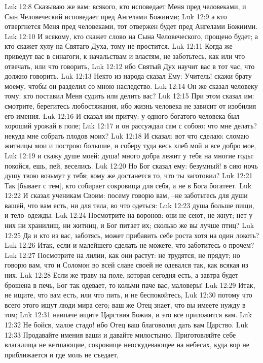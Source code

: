Luk 12:8  Сказываю же вам: всякого, кто исповедает Меня пред человеками, и Сын Человеческий исповедает пред Ангелами Божиими;
Luk 12:9  а кто отвергнется Меня пред человеками, тот отвержен будет пред Ангелами Божиими.
Luk 12:10  И всякому, кто скажет слово на Сына Человеческого, прощено будет; а кто скажет хулу на Святаго Духа, тому не простится.
Luk 12:11  Когда же приведут вас в синагоги, к начальствам и властям, не заботьтесь, как или что отвечать, или что говорить,
Luk 12:12  ибо Святый Дух научит вас в тот час, что должно говорить.
Luk 12:13  Некто из народа сказал Ему: Учитель! скажи брату моему, чтобы он разделил со мною наследство.
Luk 12:14  Он же сказал человеку тому: кто поставил Меня судить или делить вас?
Luk 12:15  При этом сказал им: смотрите, берегитесь любостяжания, ибо жизнь человека не зависит от изобилия его имения.
Luk 12:16  И сказал им притчу: у одного богатого человека был хороший урожай в поле;
Luk 12:17  и он рассуждал сам с собою: что мне делать? некуда мне собрать плодов моих?
Luk 12:18  И сказал: вот что сделаю: сломаю житницы мои и построю большие, и соберу туда весь хлеб мой и все добро мое,
Luk 12:19  и скажу душе моей: душа! много добра лежит у тебя на многие годы: покойся, ешь, пей, веселись.
Luk 12:20  Но Бог сказал ему: безумный! в сию ночь душу твою возьмут у тебя; кому же достанется то, что ты заготовил?
Luk 12:21  Так [бывает с тем], кто собирает сокровища для себя, а не в Бога богатеет.
Luk 12:22  И сказал ученикам Своим: посему говорю вам, --не заботьтесь для души вашей, что вам есть, ни для тела, во что одеться:
Luk 12:23  душа больше пищи, и тело--одежды.
Luk 12:24  Посмотрите на воронов: они не сеют, не жнут; нет у них ни хранилищ, ни житниц, и Бог питает их; сколько же вы лучше птиц?
Luk 12:25  Да и кто из вас, заботясь, может прибавить себе роста хотя на один локоть?
Luk 12:26  Итак, если и малейшего сделать не можете, что заботитесь о прочем?
Luk 12:27  Посмотрите на лилии, как они растут: не трудятся, не прядут; но говорю вам, что и Соломон во всей славе своей не одевался так, как всякая из них.
Luk 12:28  Если же траву на поле, которая сегодня есть, а завтра будет брошена в печь, Бог так одевает, то кольми паче вас, маловеры!
Luk 12:29  Итак, не ищите, что вам есть, или что пить, и не беспокойтесь,
Luk 12:30  потому что всего этого ищут люди мира сего; ваш же Отец знает, что вы имеете нужду в том;
Luk 12:31  наипаче ищите Царствия Божия, и это все приложится вам.
Luk 12:32  Не бойся, малое стадо! ибо Отец ваш благоволил дать вам Царство.
Luk 12:33  Продавайте имения ваши и давайте милостыню. Приготовляйте себе влагалища не ветшающие, сокровище неоскудевающее на небесах, куда вор не приближается и где моль не съедает,
